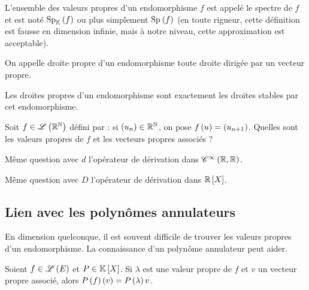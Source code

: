 L'ensemble des valeurs propres d'un endomorphisme \(f\) est appelé le spectre de \(f\) et est noté \(\Sp[\K]{f}\) ou plus simplement \(\Sp{f}\) (en toute rigueur, cette définition est fausse en dimension infinie, mais à notre niveau, cette approximation est acceptable).

\begin{defi}
On appelle droite propre d'un endomorphisme toute droite dirigée par un vecteur propre.
\end{defi}

\begin{prop}
Les droites propres d'un endomorphisme sont exactement les droites stables par cet endomorphisme.
\end{prop}

\begin{exo}
Soit \(f\in\mathscr{L}\left(\mathbb{R}^{\mathbb{N}}\right)\) défini par : si \(\left(u_n\right)\in\mathbb{R}^{\mathbb{N}}\), on pose \(f\left(u\right)=\left(u_{n+1}\right)\). Quelles sont les valeurs propres de \(f\) et les vecteurs propres associés ?
\end{exo}

\begin{exo}
Même question avec \(d\) l'opérateur de dérivation dans \(\mathscr{C}^{\infty}\left(\mathbb{R},\mathbb{R}\right)\).
\end{exo}

\begin{exo}
Même question avec \(D\) l'opérateur de dérivation dans \(\poly[\R]\).
\end{exo}

\subsection{Lien avec les polynômes annulateurs}

En dimension quelconque, il est souvent difficile de trouver les valeurs propres d'un endomorphisme. La connaissance d'un polynôme annulateur peut aider.

\begin{lem}
Soient \(f\in\mathscr{L}\left(E\right)\) et \(P\in\poly\). Si \(\lambda\) est une valeur propre de \(f\) et \(v\) un vecteur propre associé, alors \(P\left(f\right)\left(v\right)=P\left(\lambda\right)v\).
\end{lem}

